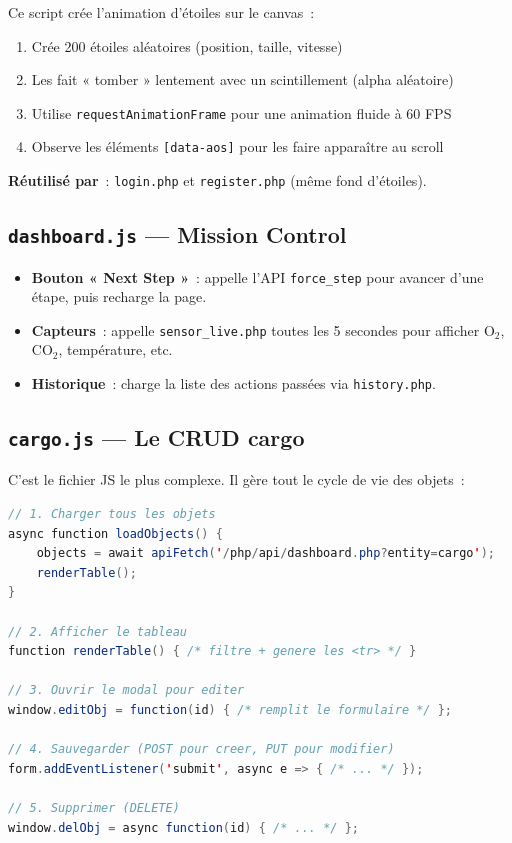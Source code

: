 \documentclass[12pt,a4paper]{article}
\begin{document}
Ce script crée l'animation d'étoiles sur le canvas~:
\begin{enumerate}
    \item Crée 200 étoiles aléatoires (position, taille, vitesse)
    \item Les fait « tomber » lentement avec un scintillement (alpha aléatoire)
    \item Utilise \texttt{requestAnimationFrame} pour une animation fluide à 60 FPS
    \item Observe les éléments \texttt{[data-aos]} pour les faire apparaître au scroll
\end{enumerate}

\textbf{Réutilisé par}~: \texttt{login.php} et \texttt{register.php} (même fond d'étoiles).

\subsection{\texttt{dashboard.js} --- Mission Control}

\begin{itemize}
    \item \textbf{Bouton « Next Step »}~: appelle l'API \texttt{force\_step} pour avancer d'une étape, puis recharge la page.
    \item \textbf{Capteurs}~: appelle \texttt{sensor\_live.php} toutes les 5 secondes pour afficher O$_2$, CO$_2$, température, etc.
    \item \textbf{Historique}~: charge la liste des actions passées via \texttt{history.php}.
\end{itemize}

\subsection{\texttt{cargo.js} --- Le CRUD cargo}

C'est le fichier JS le plus complexe. Il gère tout le cycle de vie des objets~:

\begin{lstlisting}[language=Java, title={Cycle CRUD dans cargo.js (simplifié)}]
// 1. Charger tous les objets
async function loadObjects() {
    objects = await apiFetch('/php/api/dashboard.php?entity=cargo');
    renderTable();
}

// 2. Afficher le tableau
function renderTable() { /* filtre + genere les <tr> */ }

// 3. Ouvrir le modal pour editer
window.editObj = function(id) { /* remplit le formulaire */ };

// 4. Sauvegarder (POST pour creer, PUT pour modifier)
form.addEventListener('submit', async e => { /* ... */ });

// 5. Supprimer (DELETE)
window.delObj = async function(id) { /* ... */ };
\end{lstlisting}
\end{document}
